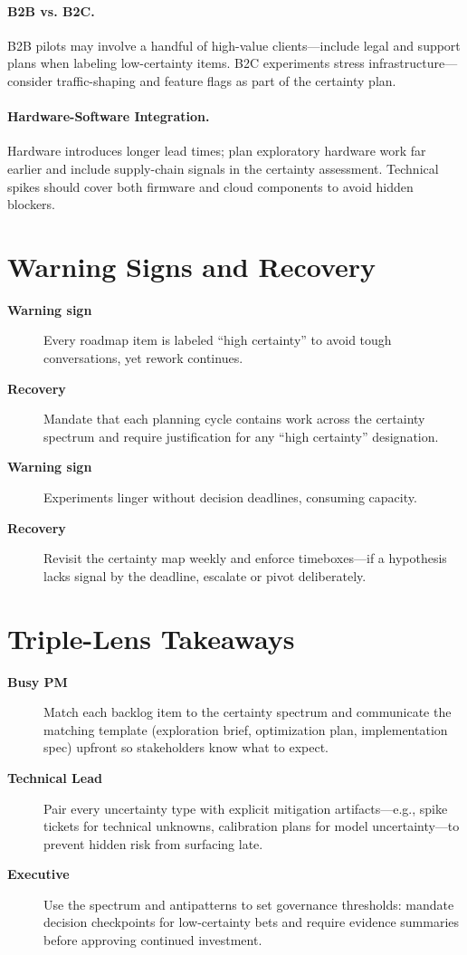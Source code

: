 \paragraph{B2B vs. B2C.} B2B pilots may involve a handful of high-value clients—include legal and support plans when labeling low-certainty items. B2C experiments stress infrastructure—consider traffic-shaping and feature flags as part of the certainty plan.

\paragraph{Hardware-Software Integration.} Hardware introduces longer lead times; plan exploratory hardware work far earlier and include supply-chain signals in the certainty assessment. Technical spikes should cover both firmware and cloud components to avoid hidden blockers.
\section{Warning Signs and Recovery}
\label{sec:uncertainty-warning}
\begin{description}
    \item[\textbf{Warning sign}] Every roadmap item is labeled ``high certainty'' to avoid tough conversations, yet rework continues.
    \item[\textbf{Recovery}] Mandate that each planning cycle contains work across the certainty spectrum and require justification for any ``high certainty'' designation.
    \item[\textbf{Warning sign}] Experiments linger without decision deadlines, consuming capacity.
    \item[\textbf{Recovery}] Revisit the certainty map weekly and enforce timeboxes—if a hypothesis lacks signal by the deadline, escalate or pivot deliberately.
\end{description}

\section{Triple-Lens Takeaways}
\label{sec:uncertainty-triple}

\begin{description}
    \item[\textbf{Busy PM}] Match each backlog item to the certainty spectrum and communicate the matching template (exploration brief, optimization plan, implementation spec) upfront so stakeholders know what to expect.
    \item[\textbf{Technical Lead}] Pair every uncertainty type with explicit mitigation artifacts—e.g., spike tickets for technical unknowns, calibration plans for model uncertainty—to prevent hidden risk from surfacing late.
    \item[\textbf{Executive}] Use the spectrum and antipatterns to set governance thresholds: mandate decision checkpoints for low-certainty bets and require evidence summaries before approving continued investment.
\end{description}


